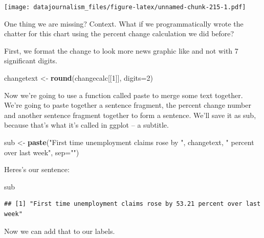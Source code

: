 \documentclass[]{book}
\newenvironment{Shaded}{\begin{snugshade}}{\end{snugshade}}
\newcommand{\DataTypeTok}[1]{\textcolor[rgb]{0.13,0.29,0.53}{#1}}
\newcommand{\DecValTok}[1]{\textcolor[rgb]{0.00,0.00,0.81}{#1}}
\newcommand{\KeywordTok}[1]{\textcolor[rgb]{0.13,0.29,0.53}{\textbf{#1}}}
\newcommand{\NormalTok}[1]{#1}
\newcommand{\StringTok}[1]{\textcolor[rgb]{0.31,0.60,0.02}{#1}}
\begin{document}
\texttt{[image: datajournalism\_files/figure-latex/unnamed-chunk-215-1.pdf]}

One thing we are missing? Context. What if we programmatically wrote the chatter for this chart using the percent change calculation we did before?

First, we format the change to look more news graphic like and not with 7 significant digits.

\begin{Shaded}
\begin{Highlighting}[]
\NormalTok{changetext <-}\StringTok{ }\KeywordTok{round}\NormalTok{(changecalc[[}\DecValTok{1}\NormalTok{]], }\DataTypeTok{digits=}\DecValTok{2}\NormalTok{)}
\end{Highlighting}
\end{Shaded}

Now we're going to use a function called paste to merge some text together. We're going to paste together a sentence fragment, the percent change number and another sentence fragment together to form a sentence. We'll save it as sub, because that's what it's called in ggplot -- a subtitle.

\begin{Shaded}
\begin{Highlighting}[]
\NormalTok{sub <-}\StringTok{ }\KeywordTok{paste}\NormalTok{(}\StringTok{"First time unemployment claims rose by "}\NormalTok{, changetext, }\StringTok{" percent over last week"}\NormalTok{, }\DataTypeTok{sep=}\StringTok{""}\NormalTok{)}
\end{Highlighting}
\end{Shaded}

Heres's our sentence:

\begin{Shaded}
\begin{Highlighting}[]
\NormalTok{sub}
\end{Highlighting}
\end{Shaded}

\begin{verbatim}
## [1] "First time unemployment claims rose by 53.21 percent over last week"
\end{verbatim}

Now we can add that to our labels.
\end{document}
